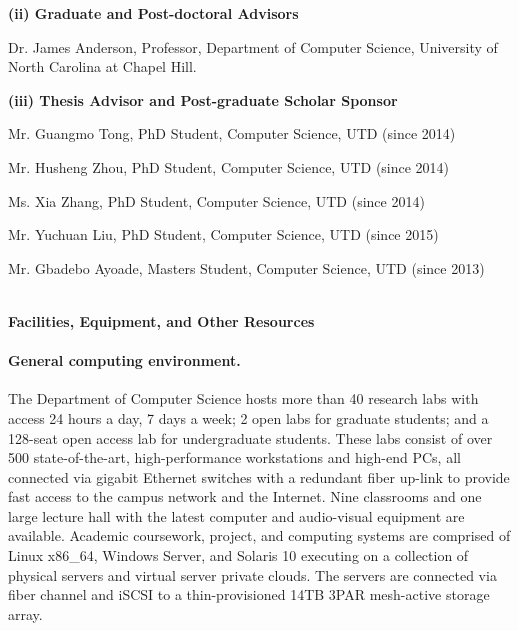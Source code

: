 \documentclass[10pt,letterpaper]{article}
\begin{document}
	\hspace{-4mm} \textbf{(ii) Graduate and Post-doctoral Advisors}\  
	\begin{changemargin}{8mm}{2mm}
	Dr. James Anderson, Professor, Department of Computer Science, University of North Carolina at Chapel Hill.
	\end{changemargin}
	
	\hspace{-4mm} \textbf{(iii) Thesis Advisor and Post-graduate Scholar Sponsor}\  
	\begin{changemargin}{8mm}{2mm}

	Mr. Guangmo Tong, PhD Student, Computer Science, UTD (since 2014)
		
	Mr. Husheng Zhou, PhD Student, Computer Science, UTD (since 2014)	
	
	Ms. Xia Zhang, PhD Student, Computer Science, UTD (since 2014)	
	
	Mr. Yuchuan Liu, PhD Student, Computer Science, UTD (since 2015)

	Mr. Gbadebo Ayoade, Masters Student, Computer Science, UTD (since 2013)	

	\end{changemargin}


\newpage
\pagenumbering{gobble}

\begin{center}
\Large{\textbf{\\Facilities, Equipment, and Other Resources}}
\end{center}

\paragraph{General computing environment.} The Department of Computer Science hosts more than 40 research labs with access 24 hours a day, 7 days a week; 2 open labs for graduate students; and a 128-seat open access lab for undergraduate students. These labs consist of over 500 state-of-the-art, high-performance workstations and high-end PCs, all connected via gigabit Ethernet switches with a redundant fiber up-link to provide fast access to the campus network and the Internet. Nine classrooms and one large lecture hall with the latest computer and audio-visual equipment are available. Academic coursework, project, and computing systems are comprised of Linux x86\_64, Windows Server, and Solaris 10 executing on a collection of physical servers and virtual server private clouds. The servers are connected via fiber channel and iSCSI to a thin-provisioned 14TB 3PAR mesh-active storage array. 
\end{document}
